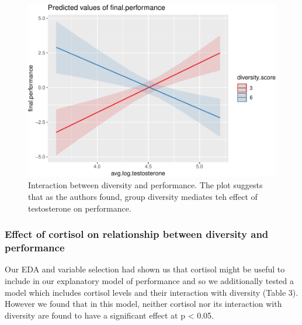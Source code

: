 \documentclass[]{article}
\begin{document}
\begin{figure}
\centering
\includegraphics{19_10_27_hw7_q1_files/figure-latex/unnamed-chunk-4-1.pdf}
\caption{\label{fig:int}Interaction between diversity and performance.
The plot suggests that as the authors found, group diversity mediates
teh effect of testosterone on performance.}
\end{figure}

\subsubsection{Effect of cortisol on relationship between diversity and
performance}\label{effect-of-cortisol-on-relationship-between-diversity-and-performance}

Our EDA and variable selection had shown us that cortisol might be
useful to include in our explanatory model of performance and so we
additionally tested a model which includes cortisol levels and their
interaction with diversity (Table 3). However we found that in this
model, neither cortisol nor its interaction with diversity are found to
have a significant effect at p \textless{} 0.05.
\end{document}
